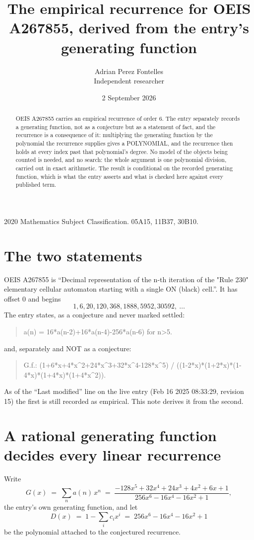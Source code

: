 \documentclass[11pt,a4paper]{article}
\title{The empirical recurrence for OEIS A267855, derived from the entry's generating function}
\author{Adrian Perez Fontelles\\ \small Independent researcher}
\date{2 September 2026}
\theoremstyle{plain}
\theoremstyle{definition}
\begin{document}
\maketitle

\begin{abstract}
OEIS A267855 carries an empirical recurrence of order $6$. The entry separately records a
generating function, not as a conjecture but as a statement of fact, and the recurrence is a
consequence of it: multiplying the generating function by the polynomial the recurrence
supplies gives a POLYNOMIAL, and the recurrence then holds at every index past that
polynomial's degree. No model of the objects being counted is needed, and no search: the
whole argument is one polynomial division, carried out in exact arithmetic. The result is
conditional on the recorded generating function, which is what the entry asserts and what is
checked here against every published term.
\end{abstract}

\noindent\small 2020 Mathematics Subject Classification. 05A15, 11B37, 30B10.\normalsize

\section{The two statements}

OEIS A267855 is ``Decimal representation of the n-th iteration of the "Rule 230" elementary cellular automaton starting with a single ON (black) cell.''. It has offset $0$ and begins
\[
1, 6, 20, 120, 368, 1888, 5952, 30592,\ \dots
\]
The entry states, as a conjecture and never marked settled:
\begin{quote}
a(n) = 16*a(n-2)+16*a(n-4)-256*a(n-6) for n>5.
\end{quote}
and, separately and NOT as a conjecture:
\begin{quote}
G.f.: (1+6*x+4*x\^{}2+24*x\^{}3+32*x\^{}4-128*x\^{}5) / ((1-2*x)*(1+2*x)*(1-4*x)*(1+4*x)*(1+4*x\^{}2)).
\end{quote}
As of the ``Last modified'' line on the live entry (Feb 16 2025 08:33:29, revision 15) the first is still
recorded as empirical. This note derives it from the second.

\section{A rational generating function decides every linear recurrence}

Write
\[
G(x)\;=\;\sum_{n}a(n)\,x^{n}\;=\;\frac{- 128 x^{5} + 32 x^{4} + 24 x^{3} + 4 x^{2} + 6 x + 1}{256 x^{6} - 16 x^{4} - 16 x^{2} + 1},
\]
the entry's own generating function, and let
\[
D(x)\;=\;1-\sum_i c_i x^{i}\;=\;256 x^{6} - 16 x^{4} - 16 x^{2} + 1
\]
be the polynomial attached to the conjectured recurrence.
\end{document}
